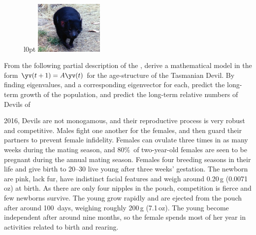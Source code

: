 \begin{exercise}  
\begin{figure}l{0pt}
\includegraphics[width=9em]{EigGen/TasmanianDevil}
\end{figure}
From the following partial description of the , 
derive a mathematical model in the form \(\yv(t+1)=A\yv(t)\) for the age-structure of the Tasmanian Devil.
By finding eigenvalues, and a corresponding eigenvector for each, predict the long-term growth of the population, and predict the long-term relative numbers of Devils of 

\begin{quoted}{ 2016, \cite[pp.~64--6]{Owen2005}}
Devils are not monogamous, and their reproductive process is very robust and competitive. 
Males fight one another for the females, and then guard their partners to prevent female infidelity. 
Females can ovulate three times in as many weeks during the mating season, and 80\%~of two-year-old females are seen to be pregnant during the annual mating season. 
Females  four breeding seasons in their life and give birth to 20--30 live young after three weeks' gestation. 
The newborn are pink, lack fur, have indistinct facial features and weigh around 0.20\,g (0.0071\,oz) at birth. 
As there are only four nipples in the pouch, competition is fierce and few newborns survive. 
The young grow rapidly and are ejected from the pouch after around 100~days, weighing roughly 200\,g (7.1\,oz). 
The young become independent after around nine months, so the female spends most of her year in activities related to birth and rearing.
\end{quoted}
\end{exercise}





